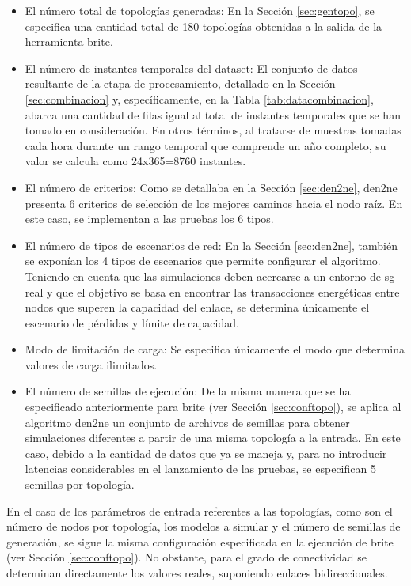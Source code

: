 \begin{itemize}
    \item El número total de topologías generadas: En la Sección \ref{sec:gentopo}, se especifica una cantidad total de 180 topologías obtenidas a la salida de la herramienta \gls{brite}.
    \item El número de instantes temporales del dataset: El conjunto de datos resultante de la etapa de procesamiento, detallado en la Sección \ref{sec:combinacion} y, específicamente, en la Tabla \ref{tab:datacombinacion}, abarca una cantidad de filas igual al total de instantes temporales que se han tomado en consideración. En otros términos, al tratarse de muestras tomadas cada hora durante un rango temporal que comprende un año completo, su valor se calcula como 24x365=8760 instantes. 
    \item El número de criterios: Como se detallaba en la Sección \ref{sec:den2ne}, \gls{den2ne} presenta 6 criterios de selección de los mejores caminos hacia el nodo raíz. En este caso, se implementan a las pruebas los 6 tipos.
    \item El número de tipos de escenarios de red: En la Sección \ref{sec:den2ne}, también se exponían los 4 tipos de escenarios que permite configurar el algoritmo. Teniendo en cuenta que las simulaciones deben acercarse a un entorno de \gls{sg} real y que el objetivo se basa en encontrar las transacciones energéticas entre nodos que superen la capacidad del enlace, se determina únicamente el escenario de pérdidas y límite de capacidad.
    \item Modo de limitación de carga: Se especifica únicamente el modo que determina valores de carga ilimitados.
    \item El número de semillas de ejecución: De la misma manera que se ha especificado anteriormente para \gls{brite} (ver Sección \ref{sec:conftopo}), se aplica al algoritmo \gls{den2ne} un conjunto de archivos de semillas para obtener simulaciones diferentes a partir de una misma topología a la entrada. En este caso, debido a la cantidad de datos que ya se maneja y, para no introducir latencias considerables en el lanzamiento de las pruebas, se especifican 5 semillas por topología.
\end{itemize}

En el caso de los parámetros de entrada referentes a las topologías, como son el número de nodos por topología, los modelos a simular y el número de semillas de generación, se sigue la misma configuración especificada en la ejecución de \gls{brite} (ver Sección \ref{sec:conftopo}). No obstante, para el grado de conectividad se determinan directamente los valores reales, suponiendo enlaces bidireccionales.

